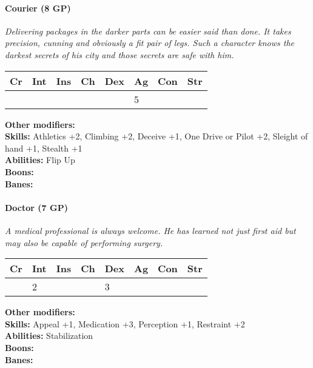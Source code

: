\paragraph*{Courier (8 GP)}
\textit{Delivering packages in the darker parts can be easier said than done. It takes precision, cunning and obviously a fit pair of legs. Such a character knows the darkest secrets of his city and those secrets are safe with him.}\par
\begin{tabular}{|l|l|l|l|l|l|l|l|}
	\hline
	Cr & Int & Ins & Ch & Dex & Ag & Con & Str \\ \hline
	&  &  &  &  & 5 &  &  \\ \hline
\end{tabular}\par
\noindent\textbf{Other modifiers:} \\
\textbf{Skills:} Athletics +2,
Climbing +2,
Deceive +1,
One Drive or Pilot +2,
Sleight of hand +1,
Stealth +1\\
\textbf{Abilities:} Flip Up\\
\textbf{Boons:} \\
\textbf{Banes:} \\

\hrulefill
\paragraph*{Doctor (7 GP)}
\textit{A medical professional is always welcome. He has learned not just first aid but may also be capable of performing surgery.}\par
\begin{tabular}{|l|l|l|l|l|l|l|l|}
	\hline
	Cr & Int & Ins & Ch & Dex & Ag & Con & Str \\ \hline
	& 2 &  &  & 3 &  &  &  \\ \hline
\end{tabular}\par
\noindent\textbf{Other modifiers:} \\
\textbf{Skills:} Appeal +1,
Medication +3,
Perception +1,
Restraint +2\\
\textbf{Abilities:} Stabilization\\
\textbf{Boons:} \\
\textbf{Banes:} \\

\hrulefill
